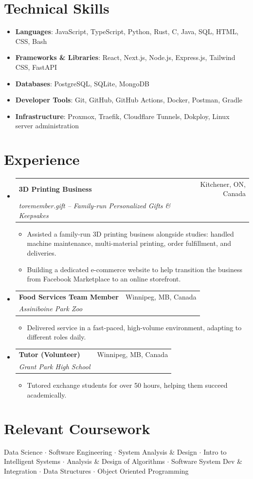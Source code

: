 \documentclass[letterpaper,11pt]{article}
\makeatletter
\newcommand{\resumeItem}[2]{
  \item\small{
    \textbf{#1}{: #2 \vspace{-2pt}}
  }
}
\newcommand{\resumeSubheading}[4]{
  \vspace{-1pt}\item
    \begin{tabular*}{0.97\textwidth}[t]{l@{\extracolsep{\fill}}r}
      \textbf{#1} & #2 \\
      \textit{\small#3} & \textit{\small #4} \\
    \end{tabular*}\vspace{-5pt}
}
\newcommand{\resumeSubHeadingListStart}{\begin{itemize}[leftmargin=*]}
\newcommand{\resumeSubHeadingListEnd}{\end{itemize}}
\newcommand{\resumeItemListStart}{\begin{itemize}}
\newcommand{\resumeItemListEnd}{\end{itemize}\vspace{-5pt}}
\makeatother
\begin{document}
\section{Technical Skills}
  \resumeSubHeadingListStart
    \resumeItem{Languages}{JavaScript, TypeScript, Python, Rust, C, Java, SQL, HTML, CSS, Bash}
    \resumeItem{Frameworks \& Libraries}{React, Next.js, Node.js, Express.js, Tailwind CSS, FastAPI}
    \resumeItem{Databases}{PostgreSQL, SQLite, MongoDB}
    \resumeItem{Developer Tools}{Git, GitHub, GitHub Actions, Docker, Postman, Gradle}
    \resumeItem{Infrastructure}{Proxmox, Traefik, Cloudflare Tunnels, Dokploy, Linux server administration}
  \resumeSubHeadingListEnd

\section{Experience}
  \resumeSubHeadingListStart
    \resumeSubheading
      {3D Printing Business}{Kitchener, ON, Canada}
      {toremember.gift -- Family-run Personalized Gifts \& Keepsakes}{}
      \resumeItemListStart
        \item\small{Assisted a family-run 3D printing business alongside studies: handled machine maintenance, multi-material printing, order fulfillment, and deliveries.}
        \item\small{Building a dedicated e-commerce website to help transition the business from Facebook Marketplace to an online storefront.}
      \resumeItemListEnd

    \resumeSubheading
      {Food Services Team Member}{Winnipeg, MB, Canada}
      {Assiniboine Park Zoo}{}
      \resumeItemListStart
        \item\small{Delivered service in a fast-paced, high-volume environment, adapting to different roles daily.}
      \resumeItemListEnd

    \resumeSubheading
      {Tutor (Volunteer)}{Winnipeg, MB, Canada}
      {Grant Park High School}{}
      \resumeItemListStart
        \item\small{Tutored exchange students for over 50 hours, helping them succeed academically.}
      \resumeItemListEnd
  \resumeSubHeadingListEnd

\section{Relevant Coursework}
  \vspace{2pt}
  \small{
    Data Science $\cdot$
    Software Engineering $\cdot$
    System Analysis \& Design $\cdot$
    Intro to Intelligent Systems $\cdot$
    Analysis \& Design of Algorithms $\cdot$
    Software System Dev \& Integration $\cdot$
    Data Structures $\cdot$
    Object Oriented Programming
  }

\end{document}

